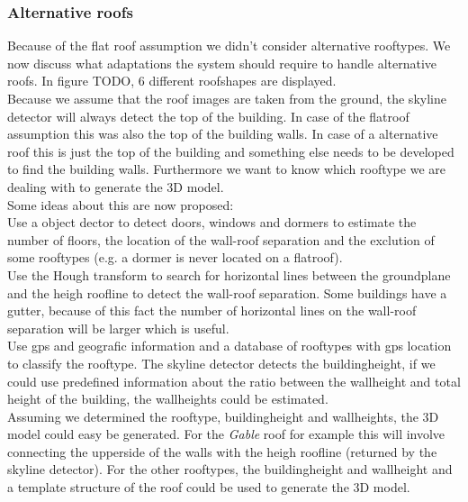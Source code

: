 \documentclass[10pt]{article}
\begin{document}
\subsubsection{Alternative roofs}


Because of the flat roof assumption we didn't consider alternative rooftypes.
We now discuss what adaptations the system should require to handle alternative roofs.
In figure TODO, 6 different roofshapes are displayed.\\
Because we assume that the roof images are taken from the ground, the skyline
detector will always detect the top of the building. In case of the flatroof
assumption this was also the top of the building walls.
In case of a alternative roof this is just the top of the building and something
else needs to be developed to find the building walls. Furthermore we want to
know which rooftype we are dealing with to generate the 3D model.\\
Some ideas about this are now proposed:\\
Use a object dector to detect doors, windows and dormers to estimate the
number of floors, the location of the wall-roof separation and the exclution of
some rooftypes (e.g. a dormer is never located on a flatroof).\\
Use the Hough transform to search for horizontal lines between the groundplane and the
heigh roofline to detect the wall-roof separation. Some buildings have a gutter,
because of this fact the number of horizontal lines on the wall-roof separation
will be larger which is useful.\\
Use gps and geografic information and a database of rooftypes with gps location
to classify the rooftype. The skyline detector detects the buildingheight, if we
could use predefined information about the ratio between the wallheight and
total height of the building, the wallheights could be estimated.\\
Assuming we determined the rooftype, buildingheight and wallheights, the 3D model could 
easy be generated. 
For the \emph{Gable} roof for example this will involve connecting the upperside of the
walls with the heigh roofline (returned by the skyline detector). For the other
rooftypes, the buildingheight and wallheight and a template structure of the
roof could be used to generate the 3D model.
\end{document}
